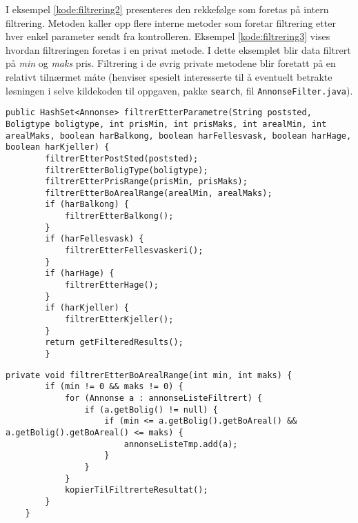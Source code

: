 I eksempel \ref{kode:filtrering2} presenteres den rekkefølge som foretas på intern filtrering. Metoden kaller opp flere interne metoder som foretar filtrering etter hver enkel parameter sendt fra kontrolleren. Eksempel \ref{kode:filtrering3} vises hvordan filtreringen foretas i en privat metode. I dette eksemplet blir data filtrert på \textit{min} og \textit{maks} pris. Filtrering i de øvrig private metodene blir foretatt på en relativt tilnærmet måte (henviser spesielt interesserte til å eventuelt betrakte løsningen i selve kildekoden til oppgaven, pakke \texttt{search}, fil \texttt{AnnonseFilter.java}). 

\begin{lstlisting}[caption=AnnonseFilter.java: Filtreringsrekkefølge etter mottatte parametre, label=kode:filtrering2]
	public HashSet<Annonse> filtrerEtterParametre(String poststed, Boligtype boligtype, int prisMin, int prisMaks, int arealMin, int arealMaks, boolean harBalkong, boolean harFellesvask, boolean harHage, boolean harKjeller) {
        filtrerEtterPostSted(poststed);
        filtrerEtterBoligType(boligtype);
        filtrerEtterPrisRange(prisMin, prisMaks);
        filtrerEtterBoArealRange(arealMin, arealMaks);
        if (harBalkong) {
            filtrerEtterBalkong();
        }
        if (harFellesvask) {
            filtrerEtterFellesvaskeri();
        }
        if (harHage) {
            filtrerEtterHage();
        }
        if (harKjeller) {
            filtrerEtterKjeller();
        }
        return getFilteredResults();
    	}
\end{lstlisting}
    
\begin{lstlisting}[caption=AnnonseFilter.java: Eksepel på privat filtreringsklasse etter bolig areal som foretas mellom trinn for pris og balkong., label=kode:filtrering3]
    private void filtrerEtterBoArealRange(int min, int maks) {
        if (min != 0 && maks != 0) {
            for (Annonse a : annonseListeFiltrert) {
                if (a.getBolig() != null) {
                    if (min <= a.getBolig().getBoAreal() && a.getBolig().getBoAreal() <= maks) {
                        annonseListeTmp.add(a);
                    }
                }
            }
            kopierTilFiltrerteResultat();
        }
    }
\end{lstlisting}